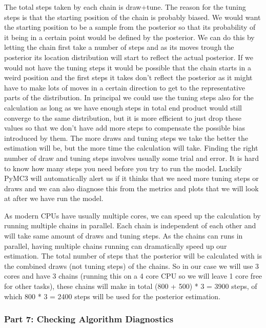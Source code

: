 \documentclass[12pt,a4paper,leqno]{report}
\theoremstyle{plain}
\theoremstyle{definition}
\theoremstyle{remark}
\begin{document}
The total steps taken by each chain is draw+tune. The reason for the tuning steps is
that the starting position of the chain is probably biased. We would want the starting
position to be a sample from the posterior so that its probability of it being in a certain
point would be defined by the posterior. We can do this by letting the chain first take
a number of steps and as its moves trough the posterior its location distribution will start to
reflect the actual posterior. If we would not have the tuning steps it would be possible
that the chain starts in a weird position and the first steps it takes don't reflect the
posterior as it might have to make lots of moves in a certain direction to get to the
representative parts of the distribution. In principal we could use the tuning steps
also for the calculation as long as we have enough steps in total end product would
still converge to the same distribution, but it is more efficient to just drop these
values so that we don't have add more steps to compensate the possible bias introduced by
them. The more draws and tuning steps we take the better the estimation will be, but the
more time the calculation will take. Finding the
right number of draw and tuning steps involves usually some trial and error. It is
hard to know how many steps you need before you try to run the model. Luckily PyMC3 will
automatically alert us if it thinks that we need more tuning steps or draws and we can
also diagnose this from the metrics and plots that we will look at after we have run the
model.


As modern CPUs have usually multiple cores, we can speed up the calculation by running
multiple chains in parallel. Each chain is independent of each other and will
take same amount of draws and tuning steps. As the chains can runs in parallel, having
multiple chains running can dramatically speed up our estimation. The total number of steps that
the posterior will be calculated with is the combined draws (not tuning steps) of the
chains. So in our case we will use 3 cores and have 3 chains (running this on a 4 core
CPU so we will leave 1 core free for other tasks), these chains will make in total (800 +
500) * 3 = 3900 steps, of which 800 * 3 = 2400 steps will be used for the posterior estimation.

\subsubsection*{Part 7: Checking Algorithm Diagnostics}
\end{document}
